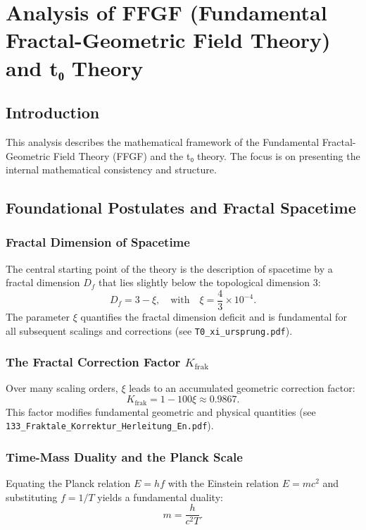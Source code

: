 \chapter{Analysis of FFGF (Fundamental Fractal-Geometric Field Theory) and t₀ Theory}

	
	
	\section{Introduction}
	This analysis describes the mathematical framework of the Fundamental Fractal-Geometric Field Theory (FFGF) and the t₀ theory. The focus is on presenting the internal mathematical consistency and structure.
	
	\section{Foundational Postulates and Fractal Spacetime}
	\subsection{Fractal Dimension of Spacetime}
	The central starting point of the theory is the description of spacetime by a fractal dimension \(D_f\) that lies slightly below the topological dimension 3:
	\begin{equation}
		D_f = 3 - \xi, \quad \text{with} \quad \xi = \frac{4}{3} \times 10^{-4}.
		\label{eq:fractal_dimension}
	\end{equation}
	The parameter \(\xi\) quantifies the fractal dimension deficit and is fundamental for all subsequent scalings and corrections
	(see \texttt{T0\_xi\_ursprung.pdf}).
	
	\subsection{The Fractal Correction Factor \(K_{\text{frak}}\)}
	Over many scaling orders, \(\xi\) leads to an accumulated geometric correction factor:
	\begin{equation}
		K_{\text{frak}} = 1 - 100\xi \approx 0.9867.
		\label{eq:K_frak}
	\end{equation}
	This factor modifies fundamental geometric and physical quantities
	(see \texttt{133\_Fraktale\_Korrektur\_Herleitung\_En.pdf}).
	
	\subsection{Time-Mass Duality and the Planck Scale}
	Equating the Planck relation \(E = hf\) with the Einstein relation \(E = mc^2\) and substituting \(f = 1/T\) yields a fundamental duality:
	\begin{equation}
		m = \frac{h}{c^2 T}.
		\label{eq:time_mass_duality}
	\end{equation}
